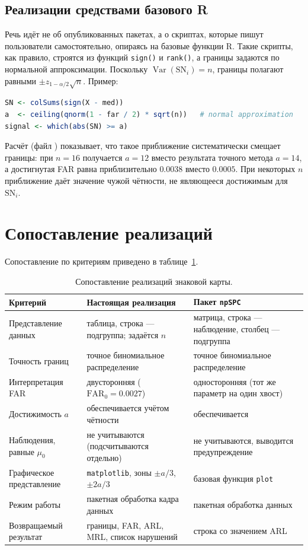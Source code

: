 \documentclass[11pt,a4paper]{article}
\newcommand{\SN}{\mathrm{SN}}
\begin{document}
\subsection{Реализации средствами базового R}

Речь идёт не об опубликованных пакетах, а о скриптах, которые пишут
пользователи самостоятельно, опираясь на базовые функции R. Такие скрипты,
как правило, строятся из функций
\texttt{sign()} и \texttt{rank()}, а границы задаются по нормальной
аппроксимации. Поскольку $\operatorname{Var}(\SN_i)=n$, границы полагают
равными $\pm z_{1-\alpha/2}\sqrt{n}$. Пример:
\begin{lstlisting}[language=R]
SN <- colSums(sign(X - med))
a  <- ceiling(qnorm(1 - far / 2) * sqrt(n))   # normal approximation
signal <- which(abs(SN) >= a)
\end{lstlisting}
Расчёт (файл ) показывает, что
такое приближение систематически смещает границы: при $n=16$ получается
$a=12$ вместо результата точного метода $a=14$, а достигнутая FAR равна приблизительно
$0.0038$ вместо $0.0005$. При некоторых $n$ приближение даёт значение чужой
чётности, не являющееся достижимым для $\SN_i$.

\section{Сопоставление реализаций}
\label{sec:cmp}

Сопоставление по критериям приведено в таблице~\ref{tab:bench}.

\begin{table}[htbp]\centering
\caption{Сопоставление реализаций знаковой карты.}
\label{tab:bench}
\small
\begin{tabular}{@{}p{3.2cm} p{4.6cm} p{4.6cm}@{}}
\toprule
Критерий & Настоящая реализация & Пакет \texttt{npSPC} \\
\midrule
Представление данных & таблица, строка --- подгруппа; задаётся $n$ &
матрица, строка --- наблюдение, столбец --- подгруппа \\
Точность границ & точное биномиальное распределение &
точное биномиальное распределение \\
Интерпретация FAR & двусторонняя ($\mathrm{FAR}_0=0.0027$) &
односторонняя (тот же параметр на один хвост) \\
Достижимость $a$ & обеспечивается учётом чётности & обеспечивается \\
Наблюдения, равные $\mu_0$ & не учитываются (подсчитываются отдельно) &
не учитываются, выводится предупреждение \\
Графическое представление & \texttt{matplotlib}, зоны $\pm a/3$, $\pm 2a/3$ &
базовая функция \texttt{plot} \\
Режим работы & пакетная обработка кадра данных & пакетная обработка данных \\
Возвращаемый результат & границы, FAR, ARL, MRL, список нарушений &
строка со значением ARL \\
\bottomrule
\end{tabular}
\end{table}
\end{document}
